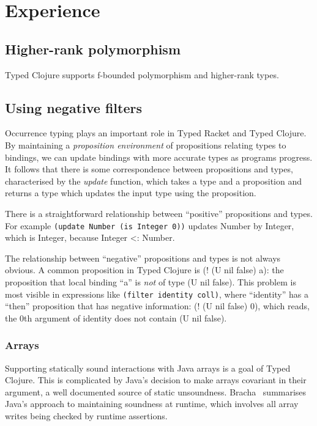 \section{Experience}

\subsection{Higher-rank polymorphism}

Typed Clojure supports f-bounded polymorphism and higher-rank
types.

\subsection{Using negative filters}

Occurrence typing plays an important role in Typed Racket and Typed Clojure.
By maintaining a \emph{proposition environment} of propositions relating types to
bindings, we can update bindings with more accurate types as programs progress.
It follows that there is some correspondence between propositions and types,
characterised by the \emph{update} function, which takes a type and a proposition
and returns a type which updates the input type using the proposition.

There is a straightforward relationship between ``positive'' propositions and types.
For example 
{\tt (update Number (is Integer 0))}
updates Number by Integer, which is Integer, because Integer <: Number.

The relationship between ``negative'' propositions and types is not always obvious.
A common proposition in Typed Clojure is (! (U nil false) a): the proposition that
local binding ``a'' is \emph{not} of type (U nil false).
This problem is most visible in expressions like {\tt (filter identity coll)}, where
``identity'' has a ``then'' proposition that has negative information: (! (U nil false) 0),
which reads, the 0th argument of identity does not contain (U nil false).

\subsubsection{Arrays}
\label{sec:arrays}

Supporting statically sound interactions with Java arrays is a goal
of Typed Clojure. This is complicated by Java's decision to make
arrays covariant in their argument, a well documented source of static
unsoundness. Bracha~\cite{Bra98} summarises Java's approach to maintaining
soundness at runtime, which involves all array writes being checked by
runtime assertions.

